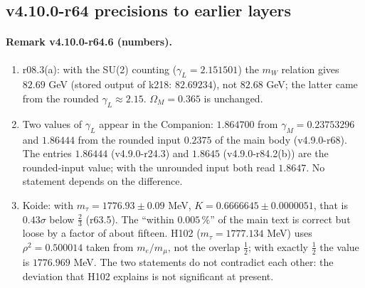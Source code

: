 \subsection*{v4.10.0-r64 precisions to earlier layers}
\label{subsec:v4100-r64-precisions}

\paragraph{Remark v4.10.0-r64.6 (numbers).}
\begin{enumerate}[leftmargin=2em]
\item[(a)] r08.3(a): with the SU(2) counting (\(\gamma_L=2.151501\)) the \(m_W\) relation gives \(82.69\) GeV (stored output of k218:
\(82.69234\)), not \(82.68\) GeV; the latter came from the rounded \(\gamma_L\approx2.15\).  \(\Omega_M=0.365\) is unchanged.
\item[(b)] Two values of \(\gamma_L\) appear in the Companion: \(1.864700\) from \(\gamma_M=0.23753296\) and \(1.86444\) from the rounded input
\(0.2375\) of the main body (v4.9.0-r68).  The entries \(1.86444\) (v4.9.0-r24.3) and \(1.8645\) (v4.9.0-r84.2(b)) are the rounded-input value;
with the unrounded input both read \(1.8647\).  No statement depends on the difference.
\item[(c)] Koide: with \(m_\tau=1776.93\pm0.09\) MeV, \(K=0.6666645\pm0.0000051\), that is \(0.43\sigma\) below \(\tfrac23\) (r63.5).  The
``within \(0.005\,\%\)'' of the main text is correct but loose by a factor of about fifteen.  H102 (\(m_\tau=1777.134\) MeV) uses
\(\rho^2=0.500014\) taken from \(m_e/m_\mu\), not the overlap \(\tfrac12\); with exactly \(\tfrac12\) the value is \(1776.969\) MeV.  The two
statements do not contradict each other: the deviation that H102 explains is not significant at present.
\end{enumerate}

